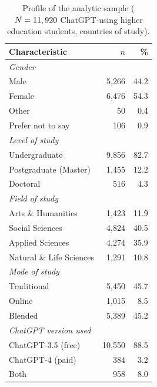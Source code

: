 \begin{table}[!htbp]
\centering
\caption{Profile of the analytic sample ($N=11,920$ ChatGPT-using higher education students, \Ncountries{} countries of study).}
\label{tab:demographics}
\small
\begin{tabular}{lrr}
\toprule
Characteristic & $n$ & \% \\
\midrule
\multicolumn{3}{l}{\textit{Gender}}\\
\quad Male & 5,266 & 44.2\\
\quad Female & 6,476 & 54.3\\
\quad Other & 50 & 0.4\\
\quad Prefer not to say & 106 & 0.9\\
\multicolumn{3}{l}{\textit{Level of study}}\\
\quad Undergraduate & 9,856 & 82.7\\
\quad Postgraduate (Master) & 1,455 & 12.2\\
\quad Doctoral & 516 & 4.3\\
\multicolumn{3}{l}{\textit{Field of study}}\\
\quad Arts \& Humanities & 1,423 & 11.9\\
\quad Social Sciences & 4,824 & 40.5\\
\quad Applied Sciences & 4,274 & 35.9\\
\quad Natural \& Life Sciences & 1,291 & 10.8\\
\multicolumn{3}{l}{\textit{Mode of study}}\\
\quad Traditional & 5,450 & 45.7\\
\quad Online & 1,015 & 8.5\\
\quad Blended & 5,389 & 45.2\\
\multicolumn{3}{l}{\textit{ChatGPT version used}}\\
\quad ChatGPT-3.5 (free) & 10,550 & 88.5\\
\quad ChatGPT-4 (paid) & 384 & 3.2\\
\quad Both & 958 & 8.0\\
\bottomrule
\end{tabular}
\end{table}
